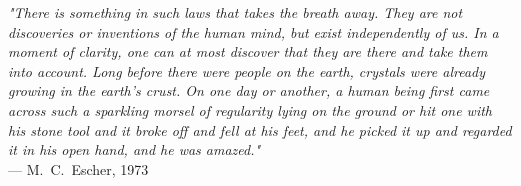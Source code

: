 \begin{flushright}
\emph{"There is something in such laws that takes the breath away. They are not discoveries or inventions of the human mind, but exist independently of us. In a moment of clarity, one can at most discover that they are there and take them into account. Long before there were people on the earth, crystals were already growing in the earth's crust. On one day or another, a human being first came across such a sparkling morsel of regularity lying on the ground or hit one with his stone tool and it broke off and fell at his feet, and he picked it up and regarded it in his open hand, and he was amazed."}\\
 — M.~C.~Escher, 1973
\end{flushright}
